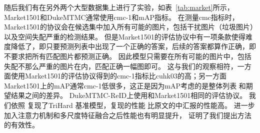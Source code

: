 随后我们有在另外两个大型数据集上进行了实验，如表~\ref{tab:market}所示，Market1501和DukeMTMC通常使用cmc-1和mAP指标。
在测量cmc指标时，Market1501的协议会在候选集中加入所有可能的图片，包括干扰图片（垃圾图片）以及空间失配严重的检测结果。
但是Market1501的评估协议中有一项条款使得难度降低了，即只要预测列表中出现了一个正确的答案，后续的答案都算作正确，即不要求把所有匹配图片都预测正确。
因此模型只需要在所有可能的图片中，包括失配不那么严重的图片在内，匹配正确一幅图即可。
这与我们的观察相符，一方面使用Market1501的评估协议得到的cmc-1指标比cuhk03的高；另一方面Market1501上的mAP通常cmc-1低很多，这正是因为mAP考虑的是整体列表
和期望结果之间的差异。
DukeMTMC-ReID上使用和Market1501相同的评估协议。
我们依照\cite{hermans2017defense} 复现了TriHard 基准模型，复现的性能
比原文的中汇报的性能高。
进一步加入注意力机制和多尺度特征融合之后性能也有明显提升，
证明了我们提出方法的有效性。

